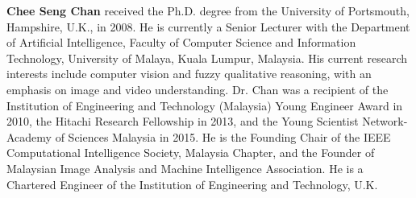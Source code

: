 \documentclass[12pt]{spieman}
\begin{document}
\begin{spacing}{1}
\vspace{1ex}
\vspace{2ex}\noindent\textbf{Chee Seng Chan} received the Ph.D. degree from the University of Portsmouth, Hampshire, U.K., in 2008. He is currently a Senior Lecturer with the Department of Artificial Intelligence, Faculty of Computer Science and Information Technology, University of Malaya, Kuala Lumpur, Malaysia. His current research interests include computer vision and fuzzy qualitative reasoning, with an emphasis on image and video understanding. Dr. Chan was a recipient of the Institution of Engineering and Technology (Malaysia) Young Engineer Award in 2010, the Hitachi Research Fellowship in 2013, and the Young Scientist Network-Academy of Sciences Malaysia in 2015. He is the Founding Chair of the IEEE Computational Intelligence Society, Malaysia Chapter, and the Founder of Malaysian Image Analysis and Machine Intelligence Association. He is a Chartered Engineer of the Institution of Engineering and Technology, U.K.


\listoffigures
\listoftables

\end{spacing}
\end{document}
